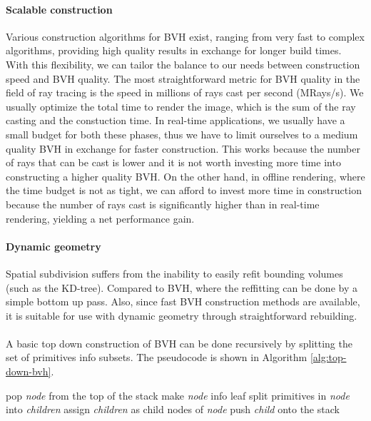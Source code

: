 \paragraph{Scalable construction} Various construction algorithms for BVH exist, ranging from very fast to complex algorithms, providing high quality results in exchange for longer build times. With this flexibility, we can tailor the balance to our needs between construction speed and BVH quality. The most straightforward metric for BVH quality in the field of ray tracing is the speed in millions of rays cast per second (MRays/s). We usually optimize the total time to render the image, which is the sum of the ray casting and the constuction time. In real-time applications, we usually have a small budget for both these phases, thus we have to limit ourselves to a medium quality BVH in exchange for faster construction. This works because the number of rays that can be cast is lower and it is not worth investing more time into constructing a higher quality BVH. On the other hand, in offline rendering, where the time budget is not as tight, we can afford to invest more time in construction because the number of rays cast is significantly higher than in real-time rendering, yielding a net performance gain. \cite{Meister2021}

\paragraph{Dynamic geometry} Spatial subdivision suffers from the inability to easily refit bounding volumes (such as the KD-tree). Compared to BVH, where the reffitting can be done by a simple bottom up pass. Also, since fast BVH construction methods are available, it is suitable for use with dynamic geometry through straightforward rebuilding. \cite{Meister2021}

\paragraph{}A basic top down construction of BVH can be done recursively by splitting the set of primitives info subsets. The pseudocode is shown in Algorithm \ref{alg:top-down-bvh}.

\begin{algorithm}[h!tb]
\caption{Basic top-down BVH construction algorithm\cite{Meister2021}.}
\label{alg:top-down-bvh}
\begin{algorithmic}[1]
    \State pop \textit{node} from the top of the stack
        \State make \textit{node} info leaf
    \Else
        \State split primitives in \textit{node} into \textit{children}
        \State assign \textit{children} as child nodes of \textit{node}
            \State push \textit{child} onto the stack
        \EndFor
    \EndIf
\EndWhile
\end{algorithmic}
\end{algorithm}

